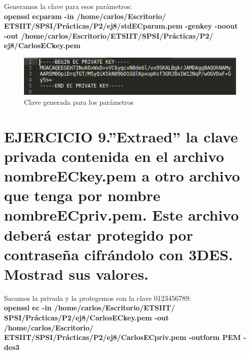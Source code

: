 Generamos la clave para esos parámetros:\\
\textbf{openssl ecparam -in /home/carlos/Escritorio/\\ETSIIT/SPSI/Prácticas/P2/ej8/stdECparam.pem -genkey -noout \\-out /home/carlos/Escritorio/ETSIIT/SPSI/Prácticas/P2/\\ej8/CarlosECkey.pem}

\begin{figure}[H] %
	\centering
	\includegraphics[scale=0.8]{imagenes/CarlosECkey} 
	\caption{Clave generada para los parámetros} \label{etiq}
\end{figure}









\section{EJERCICIO 9.''Extraed'' la clave privada contenida en el archivo nombreECkey.pem a otro archivo que tenga por nombre nombreECpriv.pem. Este archivo deberá estar protegido por contraseña cifrándolo con 3DES. Mostrad sus valores.}
Sacamos la privada y la protegemos con la clave 0123456789: \\
\textbf{openssl ec -in /home/carlos/Escritorio/ETSIIT/\\SPSI/Prácticas/P2/ej8/CarlosECkey.pem -out /home/carlos/Escritorio/\\ETSIIT/SPSI/Prácticas/P2/ej8/CarlosECpriv.pem -outform PEM -des3}

